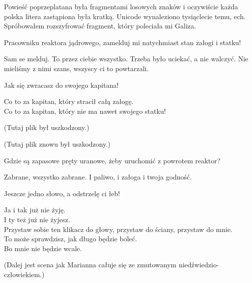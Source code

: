 Powieść poprzeplatana była fragmentami losowych znaków i oczywiście każda polska litera zastąpiona była kratką. Unicode wynaleziono tysiąclecie temu, ech.
Spróbowałem rozszyfrować fragment, który poleciała mi Galiza.

\begin{poem}
	
	\charkap{}
	Pracowniku reaktora jądrowego, zamelduj mi natychmiast stan załogi i statku!
	
	\charkos{}
	Sam se melduj. To przez ciebie wszystko. Trzeba było uciekać, a nie walczyć.
	Nie mieliśmy z nimi szans, wszyscy ci to powtarzali.
	
	\charkap{}
	Jak się zwracasz do swojego kapitana!
	
	\charkos{}
	Co to za kapitan, który stracił całą załogę. \\
	Co to za kapitan, który nie ma nawet swojego statku!
\end{poem}
	(Tutaj plik był uszkodzony.)
\begin{poem}
\end{poem}
	(Tutaj plik znowu był uszkodzony.)
\begin{poem}
	Gdzie są zapasowe pręty uranowe, żeby uruchomić z powrotem reaktor?
	
	\charkos{}
	Zabrane, wszystko zabrane.
	I paliwo, i załoga i twoja godność.
	
	\charkap{}
	Jeszcze jedno słowo, a odstrzelę ci łeb!
	
	\charkos{}
	Ja i tak już nie żyję. \\
	I ty też już nie żyjesz. \\
	Przystaw sobie ten klikacz do głowy, przystaw do ściany, przystaw do mnie. \\
	To może sprawdzisz, jak długo będzie boleć. \\
	Bo mnie nie będzie wcale.
	
	
	(Dalej jest scena jak Marianna całuje się ze zmutowanym niedźwiedzio-człowiekiem.)
\end{poem}

